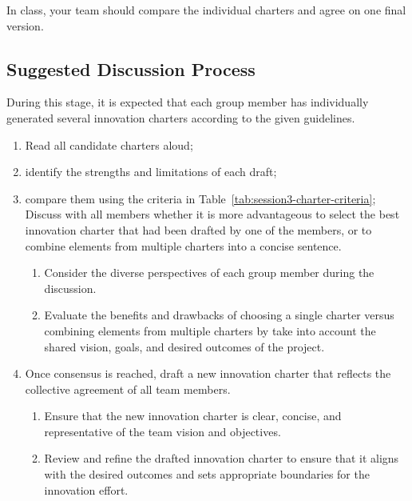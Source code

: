In class, your team should compare the individual charters and agree on one final version.

\subsection{Suggested Discussion Process}






During this stage, it is expected that each group member has individually generated several innovation charters according to the given guidelines.
\begin{enumerate}
    \item Read all candidate charters aloud;
    \item identify the strengths and limitations of each draft;
    \item compare them using the criteria in Table~\ref{tab:session3-charter-criteria};
    Discuss with all members whether it is more advantageous to select the best innovation charter that had been drafted by one of the members, or to combine elements from multiple charters into a concise sentence.
    \begin{enumerate}
        \item Consider the diverse perspectives of each group member during the discussion.
        \item Evaluate the benefits and drawbacks of choosing a single charter versus combining elements from multiple charters by take into account the shared vision, goals, and desired outcomes of the project.
    \end{enumerate}
    \item Once consensus is reached, draft a new innovation charter that reflects the collective agreement of all team members.
    \begin{enumerate}
        \item Ensure that the new innovation charter is clear, concise, and representative of the team vision and objectives.
        \item Review and refine the drafted innovation charter to ensure that it aligns with the desired outcomes and sets appropriate boundaries for the innovation effort.
    \end{enumerate}
\end{enumerate}


